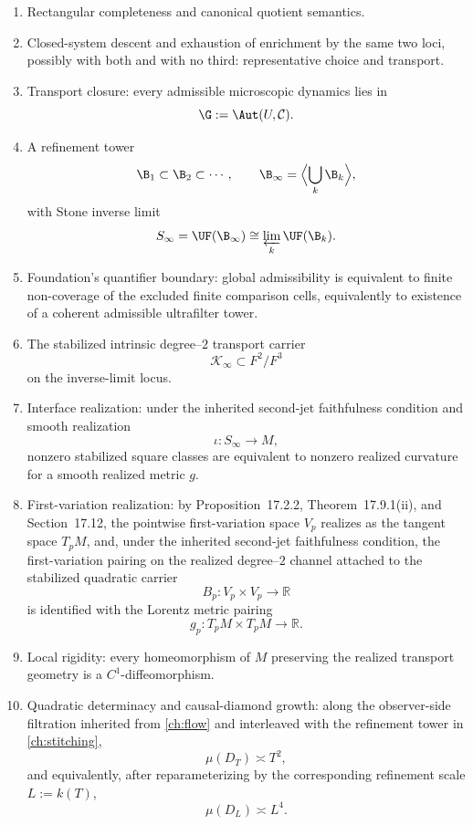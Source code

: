 \begin{enumerate}[label=\textup{(S\arabic*)}]
	\item \label{ein:S1}
	      Rectangular completeness and canonical quotient semantics.
	\item \label{ein:S2}
	      Closed-system descent and exhaustion of enrichment by the same
	      two loci, possibly with both and with no third: representative
	      choice and transport.
	\item \label{ein:S3}
	      Transport closure:
	      every admissible microscopic dynamics lies in
	      \[
		      \G:=\Aut(U,\mathcal C).
	      \]
	\item \label{ein:S4}
	      A refinement tower
	      \[
		      \B_1\subset \B_2\subset \cdots,
		      \qquad
		      \B_\infty=\Bigl\langle \bigcup_k \B_k \Bigr\rangle,
	      \]
	      with Stone inverse limit
	      \[
		      S_\infty=\UF(\B_\infty)\cong \varprojlim_k \UF(\B_k).
	      \]
	\item \label{ein:S5}
	      Foundation's quantifier boundary:
	      global admissibility is equivalent to finite non-coverage of the
	      excluded finite comparison cells, equivalently to existence of a
	      coherent admissible ultrafilter tower.
	\item \label{ein:S6}
	      The stabilized intrinsic degree--\(2\) transport carrier
	      \[
		      \mathcal K_\infty\subset F^2/F^3
	      \]
	      on the inverse-limit locus.
	\item \label{ein:S7}
	      Interface realization:
	      under the inherited second-jet faithfulness condition and smooth
	      realization
	      \[
		      \iota:S_\infty\to M,
	      \]
	      nonzero stabilized square classes are equivalent to nonzero
	      realized curvature for a smooth realized metric \(g\).
	\item \label{ein:S8}
	      First-variation realization:
	      by Proposition~17.2.2, Theorem~17.9.1(ii), and Section~17.12,
	      the pointwise first-variation space \(V_p\) realizes as the
	      tangent space \(T_pM\), and, under the inherited second-jet faithfulness condition, the first-variation pairing on the
	      realized degree--\(2\) channel attached to the stabilized
	      quadratic carrier
	      \[
		      B_p:V_p\times V_p\to\mathbb R
	      \]
	      is identified with the Lorentz metric pairing
	      \[
		      g_p:T_pM\times T_pM\to\mathbb R.
	      \]
	\item \label{ein:S9}
	      Local rigidity:
	      every homeomorphism of \(M\) preserving the realized transport geometry
	      is a \(C^1\)-diffeomorphism.
	\item \label{ein:S10}
	      Quadratic determinacy and causal-diamond growth:
	      along the observer-side filtration inherited from
	      \cref{ch:flow} and interleaved with the refinement tower in
	      \cref{ch:stitching},
	      \[
		      \mu(D_T)\asymp T^2,
	      \]
	      and equivalently, after reparameterizing by the corresponding
	      refinement scale \(L:=k(T)\),
	      \[
		      \mu(D_L)\asymp L^4.
	      \]
\end{enumerate}
